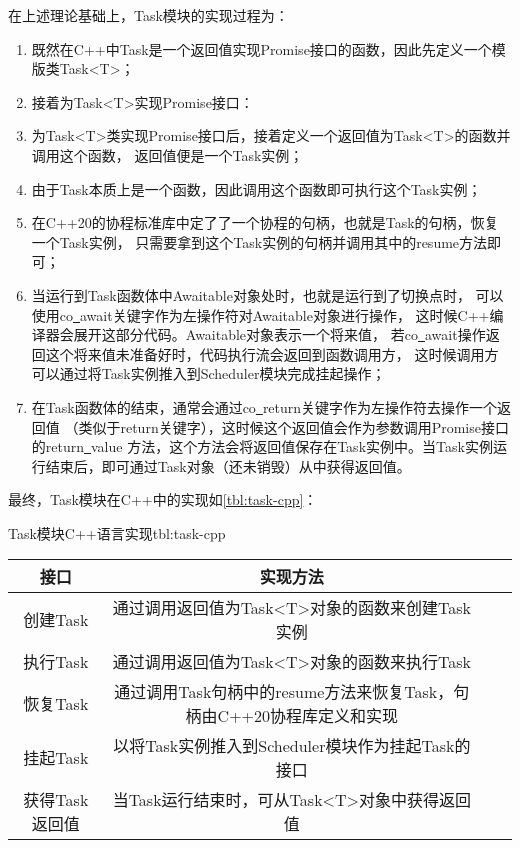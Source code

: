 \documentclass[supercite]{HustGraduPaper}
\newcommand{\rtbl}[1]{\autoref{tbl:#1}}
\newcommand*{\circled}[1]{\lower.7ex\hbox{\tikz\draw (0pt, 0pt)%
    circle (.5em) node {\makebox[1em][c]{\small #1}};}}
\theoremstyle{definition}
\begin{document}
在上述理论基础上，Task模块的实现过程为：
\begin{enumerate}[label={(\arabic*)}]
  \item 既然在C++中Task是一个返回值实现Promise接口的函数，因此先定义一个模版类Task<T>；
  \item 接着为Task<T>实现Promise接口：
  \item 为Task<T>类实现Promise接口后，接着定义一个返回值为Task<T>的函数并调用这个函数，
    返回值便是一个Task实例；
  \item 由于Task本质上是一个函数，因此调用这个函数即可执行这个Task实例；
  \item 在C++20的协程标准库中定了了一个协程的句柄，也就是Task的句柄，恢复一个Task实例，
    只需要拿到这个Task实例的句柄并调用其中的resume方法即可；
  \item 当运行到Task函数体中Awaitable对象处时，也就是运行到了切换点时，
    可以使用co\underline{~}await关键字作为左操作符对Awaitable对象进行操作，
    这时候C++编译器会展开这部分代码。Awaitable对象表示一个将来值，
    若co\underline{~}await操作返回这个将来值未准备好时，代码执行流会返回到函数调用方，
    这时候调用方可以通过将Task实例推入到Scheduler模块完成挂起操作；
  \item 在Task函数体的结束，通常会通过co\underline{~}return关键字作为左操作符去操作一个返回值
    （类似于return关键字），这时候这个返回值会作为参数调用Promise接口的return\underline{~}value
    方法，这个方法会将返回值保存在Task实例中。当Task实例运行结束后，即可通过Task对象（还未销毁）从中获得返回值。
\end{enumerate}

最终，Task模块在C++中的实现如\rtbl{task-cpp}：

\begin{generaltab}{Task模块C++语言实现}{tbl:task-cpp}
  \begin{tabular}{c|ccc}
    \toprule
    接口 & 实现方法 \\
    \midrule
    创建Task & 通过调用返回值为Task<T>对象的函数来创建Task实例\\
    执行Task & 通过调用返回值为Task<T>对象的函数来执行Task\\
    恢复Task & 通过调用Task句柄中的resume方法来恢复Task，句柄由C++20协程库定义和实现\\
    挂起Task & 以将Task实例推入到Scheduler模块作为挂起Task的接口 \\
    获得Task返回值 & 当Task运行结束时，可从Task<T>对象中获得返回值 \\
    \bottomrule
  \end{tabular}
\end{generaltab}
\end{document}
